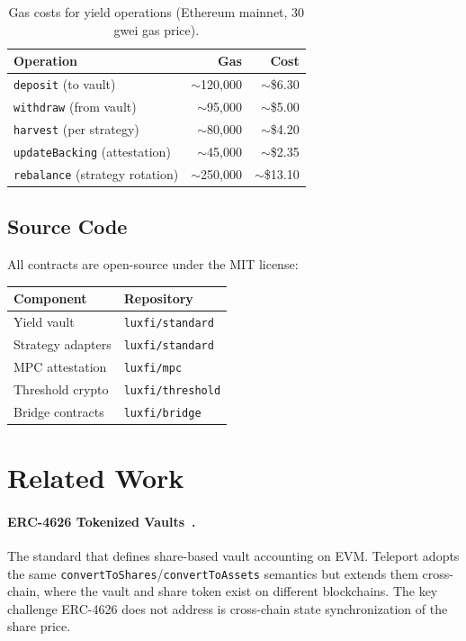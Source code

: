 \documentclass[11pt,twocolumn]{article}
\begin{document}
\begin{table}[h]
\centering
\small
\caption{Gas costs for yield operations (Ethereum mainnet, 30 gwei gas price).}
\label{tab:gas_yield}
\begin{tabular}{@{}lrr@{}}
\toprule
\textbf{Operation} & \textbf{Gas} & \textbf{Cost} \\
\midrule
\texttt{deposit} (to vault) & $\sim$120,000 & $\sim$\$6.30 \\
\texttt{withdraw} (from vault) & $\sim$95,000 & $\sim$\$5.00 \\
\texttt{harvest} (per strategy) & $\sim$80,000 & $\sim$\$4.20 \\
\texttt{updateBacking} (attestation) & $\sim$45,000 & $\sim$\$2.35 \\
\texttt{rebalance} (strategy rotation) & $\sim$250,000 & $\sim$\$13.10 \\
\bottomrule
\end{tabular}
\end{table}

\subsection{Source Code}

All contracts are open-source under the MIT license:

\begin{table}[h]
\centering
\small
\begin{tabular}{@{}ll@{}}
\toprule
\textbf{Component} & \textbf{Repository} \\
\midrule
Yield vault & \texttt{luxfi/standard} \\
Strategy adapters & \texttt{luxfi/standard} \\
MPC attestation & \texttt{luxfi/mpc} \\
Threshold crypto & \texttt{luxfi/threshold} \\
Bridge contracts & \texttt{luxfi/bridge} \\
\bottomrule
\end{tabular}
\end{table}

\section{Related Work}\label{sec:related}

\paragraph{ERC-4626 Tokenized Vaults~\cite{erc4626}.} The standard that defines share-based vault accounting on EVM. Teleport adopts the same \texttt{convertToShares}/\texttt{convertToAssets} semantics but extends them cross-chain, where the vault and share token exist on different blockchains. The key challenge ERC-4626 does not address is cross-chain state synchronization of the share price.
\end{document}
